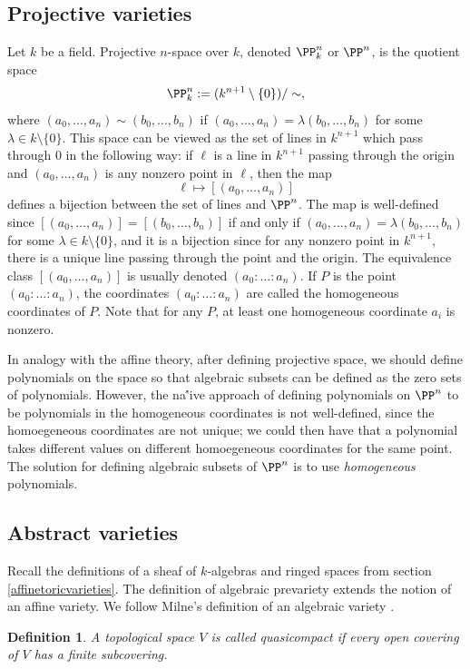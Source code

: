 \documentclass[12pt]{amsart}
\theoremstyle{plain}
\newtheorem{definition}[theorem]{Definition}
\begin{document}
\subsection{Projective varieties}
Let $k$ be a field.
Projective $n$-space over $k$, denoted $\PP^n_k$ or $\PP^n$, is the quotient space
$$\PP^n_k := (k^{n+1} \setminus \{0\}) / \sim,$$
where $(a_0, \ldots, a_{n}) \sim (b_0, \ldots, b_{n})$ if $(a_0, \ldots, a_n) = \lambda (b_0, \ldots, b_n)$ for some $\lambda \in k \setminus \{0\}$.
This space can be viewed as the set of lines in $k^{n+1}$ which pass through $0$ in the following way:
if $\ell$ is a line in $k^{n+1}$ passing through the origin and $(a_0, \ldots, a_n)$ is any nonzero point in $\ell$, then the map
$$\ell \mapsto [(a_0, \ldots, a_n)]$$
defines a bijection between the set of lines and $\PP^n$.
The map is well-defined since $[(a_0, \ldots, a_n)] = [(b_0, \ldots, b_n)]$ if and only if $(a_0, \ldots, a_n) = \lambda (b_0, \ldots, b_n)$ for some $\lambda \in k \setminus \{0\}$, and it is a bijection since for any nonzero point in $k^{n+1}$, there is a unique line passing through the point and the origin.
The equivalence class $[(a_0, \ldots, a_n)]$ is usually denoted $(a_0 : \ldots : a_n)$.
If $P$ is the point $(a_0 : \ldots : a_n)$, the coordinates $(a_0 : \ldots : a_n)$ are called the homogeneous coordinates of $P$. 
Note that for any $P$, at least one homogeneous coordinate $a_i$ is nonzero.

In analogy with the affine theory, after defining projective space, we should define polynomials on the space so that algebraic subsets can be defined as the zero sets of polynomials.
However, the na\''ive approach of defining polynomials on $\PP^n$ to be polynomials in the homogeneous coordinates is not well-defined, since the homoegeneous coordinates are not unique;
we could then have that a polynomial takes different values on different homoegeneous coordinates for the same point.
The solution for defining algebraic subsets of $\PP^n$ is to use \emph{homogeneous} polynomials.

\subsection{Abstract varieties}
Recall the definitions of a sheaf of $k$-algebras and ringed spaces from section \ref{affinetoricvarieties}.
The definition of algebraic prevariety extends the notion of an affine variety.
We follow Milne's definition of an algebraic variety \cite{Milne13}.

\begin{definition}
A topological space $V$ is called quasicompact if every open covering of $V$ has a finite subcovering.
\end{definition}
\end{document}
